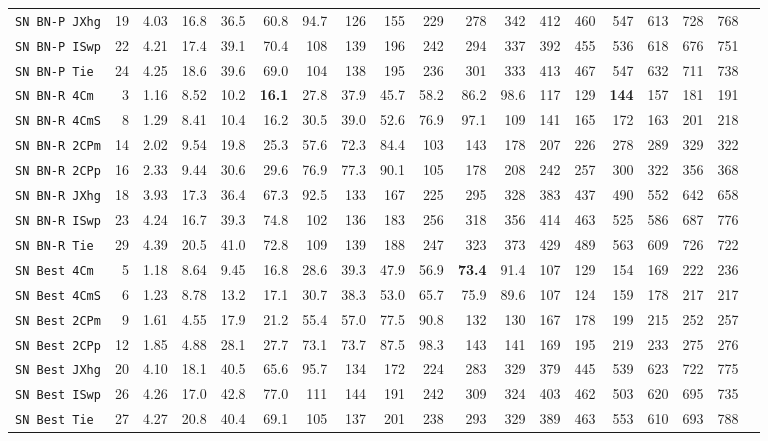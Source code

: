 \begin{tabular}{l | r @{~~} r | r@{~~}r@{~~}r@{~~}r@{~~}r@{~~}r@{~~}r@{~~}r@{~~}r@{~~}r@{~~}r@{~~}r@{~~}r@{~~}r@{~~}r@{~~}r|}
\verb+SN BN-P JXhg+ & 19 & 4.03 & 16.8&36.5&60.8&94.7&126&155&229&278&342&412&460&547&613&728&768\\
\verb+SN BN-P ISwp+ & 22 & 4.21 & 17.4&39.1&70.4&108&139&196&242&294&337&392&455&536&618&676&751\\
\verb+SN BN-P Tie + & 24 & 4.25 & 18.6&39.6&69.0&104&138&195&236&301&333&413&467&547&632&711&738\smallskip \\
\verb+SN BN-R 4Cm + & 3 & 1.16 & 8.52&10.2&\textbf{16.1}&27.8&37.9&45.7&58.2&86.2&98.6&117&129&\textbf{144}&157&181&191\\
\verb+SN BN-R 4CmS+ & 8 & 1.29 & 8.41&10.4&16.2&30.5&39.0&52.6&76.9&97.1&109&141&165&172&163&201&218\\
\verb+SN BN-R 2CPm+ & 14 & 2.02 & 9.54&19.8&25.3&57.6&72.3&84.4&103&143&178&207&226&278&289&329&322\\
\verb+SN BN-R 2CPp+ & 16 & 2.33 & 9.44&30.6&29.6&76.9&77.3&90.1&105&178&208&242&257&300&322&356&368\\
\verb+SN BN-R JXhg+ & 18 & 3.93 & 17.3&36.4&67.3&92.5&133&167&225&295&328&383&437&490&552&642&658\\
\verb+SN BN-R ISwp+ & 23 & 4.24 & 16.7&39.3&74.8&102&136&183&256&318&356&414&463&525&586&687&776\\
\verb+SN BN-R Tie + & 29 & 4.39 & 20.5&41.0&72.8&109&139&188&247&323&373&429&489&563&609&726&722\smallskip \\
\verb+SN Best 4Cm + & 5 & 1.18 & 8.64&9.45&16.8&28.6&39.3&47.9&56.9&\textbf{73.4}&91.4&107&129&154&169&222&236\\
\verb+SN Best 4CmS+ & 6 & 1.23 & 8.78&13.2&17.1&30.7&38.3&53.0&65.7&75.9&89.6&107&124&159&178&217&217\\
\verb+SN Best 2CPm+ & 9 & 1.61 & 4.55&17.9&21.2&55.4&57.0&77.5&90.8&132&130&167&178&199&215&252&257\\
\verb+SN Best 2CPp+ & 12 & 1.85 & 4.88&28.1&27.7&73.1&73.7&87.5&98.3&143&141&169&195&219&233&275&276\\
\verb+SN Best JXhg+ & 20 & 4.10 & 18.1&40.5&65.6&95.7&134&172&224&283&329&379&445&539&623&722&775\\
\verb+SN Best ISwp+ & 26 & 4.26 & 17.0&42.8&77.0&111&144&191&242&309&324&403&462&503&620&695&735\\
\verb+SN Best Tie + & 27 & 4.27 & 20.8&40.4&69.1&105&137&201&238&293&329&389&463&553&610&693&788\\
\end{tabular}
